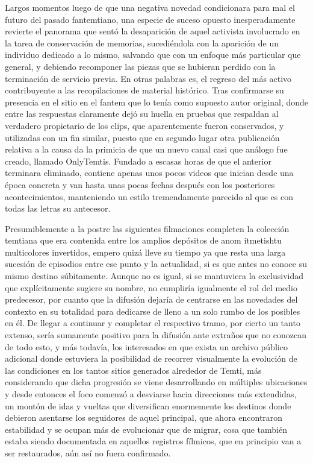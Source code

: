 \documentclass[
]{book}
\begin{document}
Largos momentos luego de que una negativa novedad condicionara para mal el futuro del pasado fantemtiano, una especie de suceso opuesto inesperadamente revierte el panorama que sentó la desaparición de aquel activista involucrado en la tarea de conservación de memorias, sucediéndola con la aparición de un individuo dedicado a lo mismo, salvando que con un enfoque más particular que general, y debiendo recomponer las piezas que se hubieran perdido con la terminación de servicio previa. En otras palabras es, el regreso del más activo contribuyente a las recopilaciones de material histórico. Tras confirmarse su presencia en el sitio en el fantem que lo tenía como supuesto autor original, donde entre las respuestas claramente dejó su huella en pruebas que respaldan al verdadero propietario de los clips, que aparentemente fueron conservados, y utilizadas con un fin similar, puesto que en segundo lugar otra publicación relativa a la causa da la primicia de que un nuevo canal casi que análogo fue creado, llamado OnlyTemtis. Fundado a escasas horas de que el anterior terminara eliminado, contiene apenas unos pocos videos que inician desde una época concreta y van hasta unas pocas fechas después con los posteriores acontecimientos, manteniendo un estilo tremendamente parecido al que es con todas las letras su antecesor.

Presumiblemente a la postre las siguientes filmaciones completen la colección temtiana que era contenida entre los amplios depósitos de anom itmetishtu multicolores invertidos, empero quizá lleve su tiempo ya que resta una larga sucesión de episodios entre ese punto y la actualidad, si es que antes no conoce su mismo destino súbitamente. Aunque no es igual, si se mantuviera la exclusividad que explícitamente sugiere su nombre, no cumpliría igualmente el rol del medio predecesor, por cuanto que la difusión dejaría de centrarse en las novedades del contexto en su totalidad para dedicarse de lleno a un solo rumbo de los posibles en él. De llegar a continuar y completar el respectivo tramo, por cierto un tanto extenso, sería sumamente positivo para la difusión ante extraños que no conozcan de todo esto, y más todavía, los interesados en que exista un archivo público adicional donde estuviera la posibilidad de recorrer visualmente la evolución de las condiciones en los tantos sitios generados alrededor de Temti, más considerando que dicha progresión se viene desarrollando en múltiples ubicaciones y desde entonces el foco comenzó a desviarse hacia direcciones más extendidas, un montón de idas y vueltas que diversifican enormemente los destinos donde debieron asentarse los seguidores de aquel principal, que ahora encontraron estabilidad y se ocupan más de evolucionar que de migrar, cosa que también estaba siendo documentada en aquellos registros fílmicos, que en principio van a ser restaurados, aún así no fuera confirmado.
\end{document}
